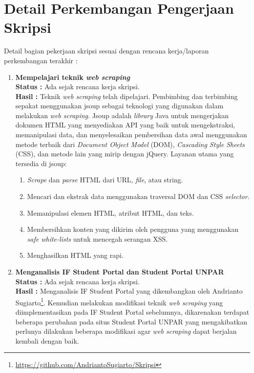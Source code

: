 \documentclass[a4paper,twoside]{article}
\begin{document}
\section{Detail Perkembangan Pengerjaan Skripsi}
Detail bagian pekerjaan skripsi sesuai dengan rencana kerja/laporan perkembangan terakhir :
	\begin{enumerate}
		\item \textbf{Mempelajari teknik \textit{web scraping}}\\
		{\bf Status :} Ada sejak rencana kerja skripsi.\\
		{\bf Hasil :} Teknik \textit{web scraping} telah dipelajari. Pembimbing dan terbimbing sepakat menggunakan jsoup sebagai teknologi yang digunakan dalam melakukan \textit{web scraping}. Jsoup adalah \textit{library} Java untuk mengerjakan dokumen HTML yang menyediakan API yang baik untuk mengekstraksi, memanipulasi data, dan menyelesaikan pembersihan data awal menggunakan metode terbaik dari \textit{Document Object Model} (DOM), \textit{Cascading Style Sheets} (CSS), dan metode lain yang mirip dengan jQuery. Layanan utama yang tersedia di jsoup:
        \begin{enumerate}
            \item \textit{Scrape} dan \textit{parse} HTML dari URL, \textit{file}, atau string.
            \item Mencari dan ekstrak data menggunakan traversal DOM dan CSS \textit{selector}.
            \item Memanipulasi elemen HTML, atribut HTML, dan teks.
            \item Membersihkan konten yang dikirim oleh pengguna yang menggunakan \textit{safe white-lists} untuk mencegah serangan XSS.
            \item Menghasilkan HTML yang rapi.
        \end{enumerate}
		
		
		\item \textbf{Menganalisis IF Student Portal dan Student Portal UNPAR}\\
		{\bf Status :} Ada sejak rencana kerja skripsi.\\
		{\bf Hasil :} Menganalisis IF Student Portal yang dikembangkan oleh Andrianto Sugiarto\footnote{\url{https://github.com/AndriantoSugiarto/Skripsi}}. Kemudian melakukan modifikasi teknik \textit{web scraping} yang diimplementasikan pada IF Student Portal sebelumnya, dikarenakan terdapat beberapa perubahan pada situs Student Portal UNPAR yang mengakibatkan perlunya dilakukan beberapa modifikasi agar \textit{web scraping} dapat berjalan kembali dengan baik.



\end{enumerate}
\end{document}
